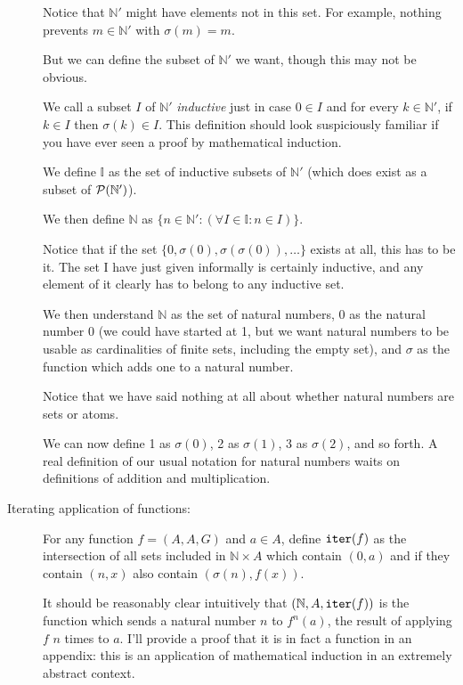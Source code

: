 \documentclass[12pt]{article}
\begin{document}
\begin{description}
Notice that $\mathbb N'$ might have elements not in this set.  For example, nothing prevents $m \in \mathbb N'$ with
$\sigma(m)=m$.

But we can define the subset of $\mathbb N'$ we want, though this may not be obvious.

We call a subset $I$ of $\mathbb N'$ {\em inductive\/} just in case $0 \in I$ and for every $k \in \mathbb N'$, if
$k \in I$ then $\sigma(k) \in I$.  This definition should look suspiciously familiar if you have ever seen a proof by mathematical induction.

We define $\mathbb I$ as the set of inductive subsets of $\mathbb N'$ (which does exist as a subset of ${\cal P}(\mathbb N')$).

We then define $\mathbb N$ as $\{n \in \mathbb N':(\forall I \in {\mathbb I}:n \in I)\}$.

Notice that if the set $\{0, \sigma(0), \sigma(\sigma(0)),\ldots\}$  exists at all, this has to be it.  The set I have just given informally is certainly inductive, and any element of it clearly has to belong to any inductive set.

We then understand $\mathbb N$ as the set of natural numbers, 0 as the natural number 0 (we could have started at 1, but we want natural numbers to be usable as cardinalities of finite sets, including the empty set), and $\sigma$ as the function which adds one to a natural number.

Notice that we have said nothing at all about whether natural numbers are sets or atoms.

We can now define 1 as $\sigma(0)$, 2 as $\sigma(1)$, 3 as $\sigma(2)$, and so forth.  A real definition of our usual notation for natural numbers waits on definitions of addition and multiplication.

\item[Iterating application of functions:]

For any function $f = (A,A,G)$ and $a \in A$, define ${\tt iter}(f)$ as the intersection of all sets included in $\mathbb N \times A$ which contain
$(0,a)$ and if they contain $(n,x)$ also contain $(\sigma(n),f(x))$.

It should be reasonably clear intuitively that $(\mathbb N,A,{\tt iter}(f))$ is the function which sends a natural number $n$ to $f^n(a)$, the result of applying $f$ $n$ times to $a$.  I'll provide a proof that it is in fact a function in an appendix:  this is an application of mathematical induction in an extremely abstract context.


\end{description}
\end{document}
